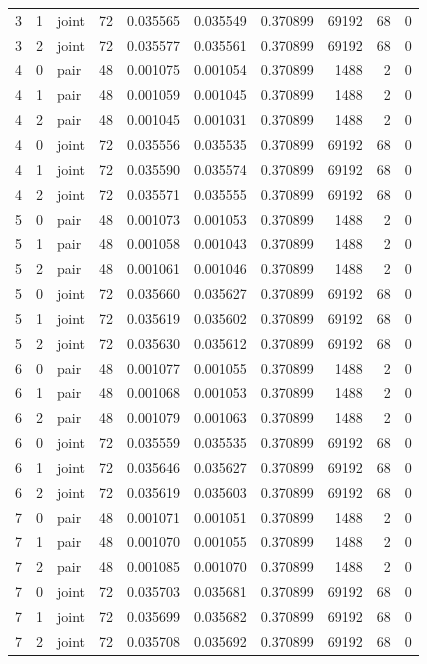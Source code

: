 \begin{tabular}{rrlrrrrrrr}
3 & 1 & joint & 72 & 0.035565 & 0.035549 & 0.370899 & 69192 & 68 & 0 \\
3 & 2 & joint & 72 & 0.035577 & 0.035561 & 0.370899 & 69192 & 68 & 0 \\
4 & 0 & pair & 48 & 0.001075 & 0.001054 & 0.370899 & 1488 & 2 & 0 \\
4 & 1 & pair & 48 & 0.001059 & 0.001045 & 0.370899 & 1488 & 2 & 0 \\
4 & 2 & pair & 48 & 0.001045 & 0.001031 & 0.370899 & 1488 & 2 & 0 \\
4 & 0 & joint & 72 & 0.035556 & 0.035535 & 0.370899 & 69192 & 68 & 0 \\
4 & 1 & joint & 72 & 0.035590 & 0.035574 & 0.370899 & 69192 & 68 & 0 \\
4 & 2 & joint & 72 & 0.035571 & 0.035555 & 0.370899 & 69192 & 68 & 0 \\
5 & 0 & pair & 48 & 0.001073 & 0.001053 & 0.370899 & 1488 & 2 & 0 \\
5 & 1 & pair & 48 & 0.001058 & 0.001043 & 0.370899 & 1488 & 2 & 0 \\
5 & 2 & pair & 48 & 0.001061 & 0.001046 & 0.370899 & 1488 & 2 & 0 \\
5 & 0 & joint & 72 & 0.035660 & 0.035627 & 0.370899 & 69192 & 68 & 0 \\
5 & 1 & joint & 72 & 0.035619 & 0.035602 & 0.370899 & 69192 & 68 & 0 \\
5 & 2 & joint & 72 & 0.035630 & 0.035612 & 0.370899 & 69192 & 68 & 0 \\
6 & 0 & pair & 48 & 0.001077 & 0.001055 & 0.370899 & 1488 & 2 & 0 \\
6 & 1 & pair & 48 & 0.001068 & 0.001053 & 0.370899 & 1488 & 2 & 0 \\
6 & 2 & pair & 48 & 0.001079 & 0.001063 & 0.370899 & 1488 & 2 & 0 \\
6 & 0 & joint & 72 & 0.035559 & 0.035535 & 0.370899 & 69192 & 68 & 0 \\
6 & 1 & joint & 72 & 0.035646 & 0.035627 & 0.370899 & 69192 & 68 & 0 \\
6 & 2 & joint & 72 & 0.035619 & 0.035603 & 0.370899 & 69192 & 68 & 0 \\
7 & 0 & pair & 48 & 0.001071 & 0.001051 & 0.370899 & 1488 & 2 & 0 \\
7 & 1 & pair & 48 & 0.001070 & 0.001055 & 0.370899 & 1488 & 2 & 0 \\
7 & 2 & pair & 48 & 0.001085 & 0.001070 & 0.370899 & 1488 & 2 & 0 \\
7 & 0 & joint & 72 & 0.035703 & 0.035681 & 0.370899 & 69192 & 68 & 0 \\
7 & 1 & joint & 72 & 0.035699 & 0.035682 & 0.370899 & 69192 & 68 & 0 \\
7 & 2 & joint & 72 & 0.035708 & 0.035692 & 0.370899 & 69192 & 68 & 0 \\
\bottomrule
\end{tabular}

